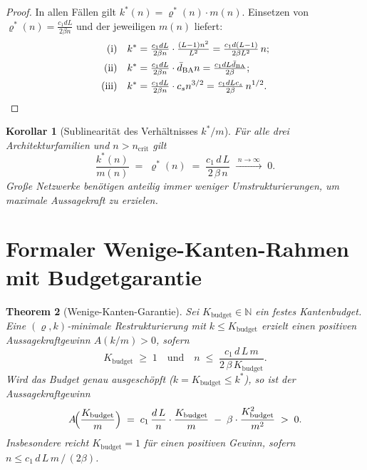 ﻿\documentclass[12pt, a4paper, openany]{report}
\newtheorem{theorem}{Theorem}[chapter]
\newtheorem{corollary}[theorem]{Korollar}
\newcommand{\N}{\mathbb{N}}
\begin{document}
\begin{proof}
In allen Fällen gilt $k^*(n) = \varrho^*(n)\cdot m(n)$.  Einsetzen von
$\varrho^*(n) = \frac{c_1 dL}{2\beta n}$ und der jeweiligen $m(n)$ liefert:
\begin{align*}
  \text{(i)} &\quad k^* = \tfrac{c_1 dL}{2\beta n}\cdot\tfrac{(L-1)n^2}{L^2}
                = \tfrac{c_1 d(L-1)}{2\beta L^2}\,n; \\
  \text{(ii)}&\quad k^* = \tfrac{c_1 dL}{2\beta n}\cdot\bar{d}_{\mathrm{BA}} n
                = \tfrac{c_1 dL\bar{d}_{\mathrm{BA}}}{2\beta}; \\
  \text{(iii)}&\quad k^* = \tfrac{c_1 dL}{2\beta n}\cdot c_s n^{3/2}
                = \tfrac{c_1 dLc_s}{2\beta}\,n^{1/2}. \qedhere
\end{align*}
\end{proof}

\begin{corollary}[Sublinearität des Verhältnisses $k^*/m$]
\label{cor:k_over_m}
Für alle drei Architekturfamilien und $n > n_{\mathrm{crit}}$ gilt
\[
  \frac{k^*(n)}{m(n)} \;=\; \varrho^*(n) \;=\;
  \frac{c_1\,d\,L}{2\,\beta\,n}
  \;\xrightarrow{\;n\to\infty\;}\; 0.
\]
Große Netzwerke benötigen \emph{anteilig immer weniger Umstrukturierungen},
um maximale Aussagekraft zu erzielen.
\end{corollary}

\section{Formaler Wenige-Kanten-Rahmen mit Budgetgarantie}
\label{sec:scaling_budget}

\begin{theorem}[Wenige-Kanten-Garantie]
\label{thm:few_edges_guarantee}
Sei $K_{\mathrm{budget}} \in \N$ ein festes Kantenbudget.  Eine
$(\varrho, k)$-minimale Restrukturierung mit $k \leq K_{\mathrm{budget}}$
erzielt einen positiven Aussagekraftgewinn $A(k/m) > 0$, sofern
\begin{equation}
  \label{eq:budget_condition}
  K_{\mathrm{budget}} \;\geq\; 1
  \quad\text{und}\quad
  n \;\leq\; \frac{c_1\,d\,L\,m}{2\,\beta\,K_{\mathrm{budget}}}.
\end{equation}
Wird das Budget genau ausgeschöpft ($k = K_{\mathrm{budget}} \leq k^*$), so ist
der Aussagekraftgewinn
\begin{equation}
  \label{eq:A_budget}
  A\!\Bigl(\frac{K_{\mathrm{budget}}}{m}\Bigr)
  \;=\; c_1\,\frac{d\,L}{n}\cdot\frac{K_{\mathrm{budget}}}{m}
  \;-\; \beta\cdot\frac{K_{\mathrm{budget}}^2}{m^2}
  \;>\; 0.
\end{equation}
Insbesondere reicht $K_{\mathrm{budget}} = 1$ für einen positiven Gewinn,
sofern $n \leq c_1\,d\,L\,m\,/\,(2\beta)$.
\end{theorem}
\end{document}
